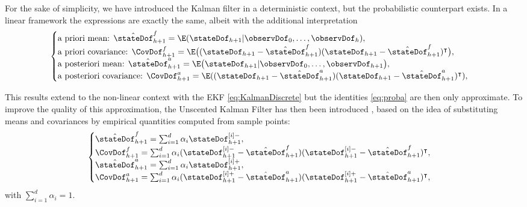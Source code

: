 \documentclass{tufte-book}
\newcounter{points}
\begin{document}
For the sake of simplicity, we have introduced the Kalman filter in a deterministic context, but the probabilistic counterpart exists. In a linear framework the expressions are exactly the same, albeit with the additional interpretation
\begin{equation}\label{eq:proba}
	\begin{cases}
			\text{a priori mean: } \hat{\stateDof}_{h+1}^f = \E(\stateDof_{h+1}|\observDof_0,\ldots,\observDof_h),	\\
			\text{a priori covariance: }  \CovDof_{h+1}^f = \E\bigl((\stateDof_{h+1}-\hat{\stateDof}_{h+1}^f)(\stateDof_{h+1}-\hat{\stateDof}_{h+1}^f)^\intercal\bigr), \\
			\text{a posteriori mean: } \hat{\stateDof}_{h+1}^a = \E\bigl(\stateDof_{h+1}|\observDof_0,\ldots,\observDof_{h+1}\bigr), \\
			\text{a posteriori covariance: } \CovDof_{h+1}^a = \E((\stateDof_{h+1}-\hat{\stateDof}_{h+1}^a)(\stateDof_{h+1}-\hat{\stateDof}_{h+1}^a)^\intercal),
	\end{cases}
\end{equation}

This results extend to the non-linear context with the EKF \eqref{eq:KalmanDiscrete} but the identities \eqref{eq:proba} are then only approximate. To improve the quality of this approximation, the Unscented Kalman Filter has then been introduced \cite{Julier00}, based on the idea of substituting means and covariances by empirical quantities computed from sample points:
\begin{equation}\label{eq:probaEmpirical}
	\begin{cases}
			\hat{\stateDof}_{h+1}^f = \sum_{i=1}^d \alpha_i\stateDof_{h+1}^{[i]-},	\\
			\CovDof_{h+1}^f = \sum_{i=1}^d \alpha_i(\stateDof_{h+1}^{[i]-}-\hat{\stateDof}_{h+1}^f)(\stateDof_{h+1}^{[i]-}-\hat{\stateDof}_{h+1}^f)^\intercal, \\
			\hat{\stateDof}_{h+1}^a = \sum_{i=1}^d \alpha_i\stateDof_{h+1}^{[i]+}, \\
			\CovDof_{h+1}^a = \sum_{i=1}^d \alpha_i(\stateDof_{h+1}^{[i]+}-\hat{\stateDof}_{h+1}^a)(\stateDof_{h+1}^{[i]+}-\hat{\stateDof}_{h+1}^a)^\intercal,
	\end{cases}
\end{equation}
with $\sum_{i=1}^d \alpha_i = 1$.
\end{document}
